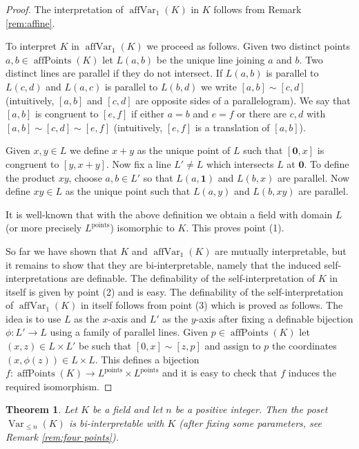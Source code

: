\documentclass{amsart}
\theoremstyle{plain}
\newtheorem{thm}{Theorem}[section]
\theoremstyle{definition}
\newcommand{\nVar}[2]{\operatorname{Var}_{#2} (#1)}
\newcommand{\pt}[1]{{#1}^{\text{points}}}
\newcommand{\affPoints}[1]{\operatorname{affPoints} (#1)}
\newcommand{\naffVar}[2]{\operatorname{affVar}_{#2}(#1)}
\begin{document}
\begin{proof} 
	The interpretation of $\naffVar K 1$ in $K$ follows from Remark \ref{rem:affine}. 
	
	To interpret $K$ in $\naffVar K 1$ we proceed as follows.
	Given two distinct points $a,b\in \affPoints K$ let $L(a,b)$ be the unique line joining $a$ and $b$. Two distinct lines are parallel if they do not intersect. If $L(a,b)$ is parallel to $L(c,d)$ and $L(a,c)$ is parallel to $L(b,d)$ we write $[a,b]\sim [c,d]$ (intuitively, $[a,b]$ and $[c,d]$ are opposite sides of a parallelogram). We say that $[a,b]$ is congruent to $[e,f]$ if either $a=b$ and $e=f$ or there are $c,d$ with $[a,b]\sim [c,d] \sim [e,f]$ (intuitively, $[e,f]$ is a translation of $[a,b]$). 
	
	Given $x,y\in L$ we define $x+y$ as the unique point of $L$ such that $[\mathbf 0,x]$ is congruent to $[y,x+y]$. Now fix a line $L' \neq L$  which intersects $L$ at $\mathbf 0$.
	To define the product $xy$, choose $a,b\in L'$ so that $L(a,\mathbf 1)$ and $L(b,x)$ are parallel. Now define $xy\in L$ as the unique point such that $L(a,y)$ and $L(b,xy)$ are parallel.  
	
	It is well-known that with the above definition we obtain a field with domain $L$ (or more precisely $L^{\text{points}}$) isomorphic to $K$. This proves point (1). 
	
	So far we have shown that $K$ and $\naffVar K 1$ are mutually interpretable, but it remains to show that they are bi-interpretable, namely that the induced self-interpretations are definable. The definability of the self-interpretation of $K$ in itself is given by point (2) and is easy. The definability of the self-interpretation of $\naffVar K 1$ in itself follows from point (3) which is proved as follows. The idea is to use $L$ as the $x$-axis and $L'$ as the $y$-axis after fixing a definable bijection $\phi:L'\to L$ using a family of parallel lines. Given $p\in \affPoints K$ let $(x,z) \in L\times L'$ be such that $[0,x]\sim [z,p]$ and assign to $p$ the coordinates $(x, \phi(z)) \in L\times L$. This defines a bijection $f:\affPoints K \to \pt L \times \pt L$ and it is easy to check that $f$ induces the required isomorphism.
\end{proof}

\begin{thm}\label{thm:curves-field} Let $K$ be a field and let $n$ be a positive integer. Then the poset $\nVar K {\leq n}$ is bi-interpretable with $K$ (after fixing some parameters, see Remark \ref{rem:four points}). 
\end{thm}
\end{document}
